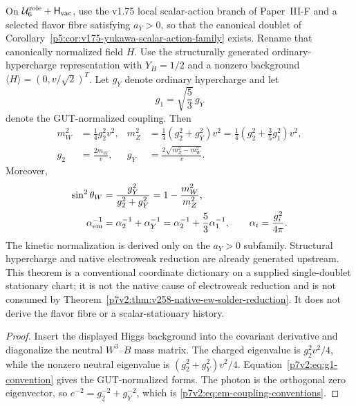 \documentclass[12pt,a4paper]{article}
\newcommand{\Hvac}{\mathsf{H}_{\rm vac}}
\newcommand{\Urole}{\mathcal U_6^{\rm role}}
\begin{document}
\begin{theorem}
\label{p7v2:thm:ew-mass-dictionary}
On \(\Urole+\Hvac\), use the v1.75 local scalar-action branch of
Paper~III-F and a selected flavor fibre satisfying \(a_Y>0\), so that the
canonical doublet of
Corollary~\ref{p5:cor:v175-yukawa-scalar-action-family} exists.  Rename that
canonically normalized field \(H\).  Use the structurally generated ordinary-hypercharge representation with
\(Y_H=1/2\) and a nonzero background
\(\langle H\rangle=(0,v/\sqrt2)^T\).  Let \(g_Y\) denote ordinary hypercharge
and let
\begin{equation}
\label{p7v2:eq:g1-convention}
 g_1=\sqrt{\frac53}\,g_Y
\end{equation}
denote the GUT-normalized coupling.  Then
\begin{align}
\label{p7v2:eq:ew-mass-dictionary}
 m_W^2&=\frac14g_2^2v^2,
 &
 m_Z^2&=\frac14(g_2^2+g_Y^2)v^2
       =\frac14\left(g_2^2+\frac35g_1^2\right)v^2,\\
 g_2&=\frac{2m_W}{v},
 &
 g_Y&=\frac{2\sqrt{m_Z^2-m_W^2}}{v}.
\end{align}
Moreover,
\begin{align}
\label{p7v2:eq:em-coupling-conventions}
 \sin^2\theta_W
 &=\frac{g_Y^2}{g_2^2+g_Y^2}
  =1-\frac{m_W^2}{m_Z^2},\\
 \alpha_{\rm em}^{-1}
 &=\alpha_2^{-1}+\alpha_Y^{-1}
  =\alpha_2^{-1}+\frac53\alpha_1^{-1},
 \qquad
 \alpha_i=\frac{g_i^2}{4\pi}.
\end{align}
The kinetic normalization is derived only on the \(a_Y>0\) subfamily.
Structural hypercharge and native electroweak reduction are already generated upstream.  This theorem is a conventional coordinate dictionary on a supplied single-doublet stationary chart; it is not the native cause of electroweak reduction and is not consumed by Theorem~\ref{p7v2:thm:v258-native-ew-solder-reduction}.  It does not derive the flavor fibre or a scalar-stationary history.
\end{theorem}

\begin{proof}
Insert the displayed Higgs background into the covariant derivative and
diagonalize the neutral \(W^3\)--\(B\) mass matrix.  The charged eigenvalue is
\(g_2^2v^2/4\), while the nonzero neutral eigenvalue is
\((g_2^2+g_Y^2)v^2/4\).  Equation~\eqref{p7v2:eq:g1-convention} gives the
GUT-normalized forms.  The photon is the orthogonal zero eigenvector, so
\(e^{-2}=g_2^{-2}+g_Y^{-2}\), which is
\eqref{p7v2:eq:em-coupling-conventions}.
\end{proof}
\end{document}

